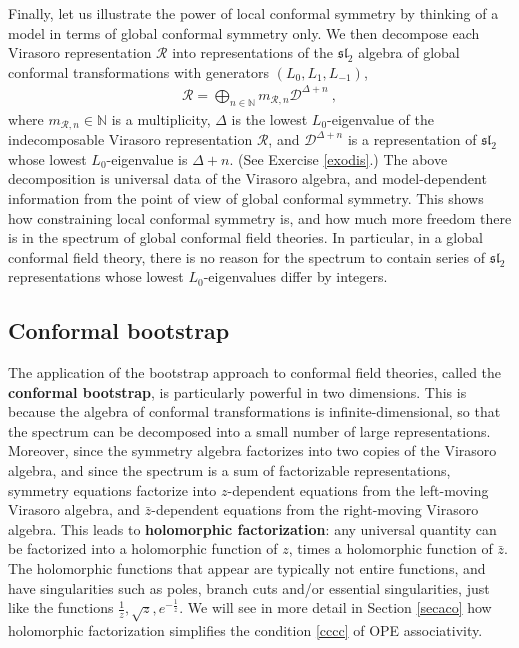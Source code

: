 \documentclass[12pt, a4paper, notitlepage, twoside]{report}
\numberwithin{equation}{section}
\theoremstyle{break}
\begin{document}
Finally, let us illustrate the power of local conformal symmetry by thinking of a model in terms of global conformal symmetry only. 
We then decompose each Virasoro representation $\mathcal{R}$ into representations of the $\mathfrak{sl}_2$ algebra of global conformal transformations with generators $(L_0,L_1,L_{-1})$,
\begin{align}
 \mathcal{R}=\bigoplus_{n\in{\mathbb{N}}} m_{\mathcal{R},n} \mathcal{D}^{\Delta+n}\ ,
\label{rbd}
\end{align}
where $m_{\mathcal{R},n}\in {\mathbb{N}}$ is a multiplicity, $\Delta$ is the lowest $L_0$-eigenvalue of the indecomposable Virasoro representation $\mathcal{R}$, and $\mathcal{D}^{\Delta+n}$ is a representation of $\mathfrak{sl}_2$ whose lowest $L_0$-eigenvalue is $\Delta+n$.
(See Exercise \ref{exodis}.)
The above decomposition is universal data of the Virasoro algebra, and 
model-dependent information from the point of view of global conformal symmetry.
This shows how constraining local conformal symmetry is, and how much more freedom there is in the spectrum of global conformal field theories.
In particular, in a global conformal field theory, there is no reason for the spectrum to contain series of
$\mathfrak{sl}_2$ representations whose lowest $L_0$-eigenvalues differ by integers. 


\subsection{Conformal bootstrap}

The application of the bootstrap approach to conformal field theories, called the \textbf{conformal bootstrap}, 
is particularly powerful in two dimensions.
This is because the algebra of conformal transformations is infinite-dimensional, 
so that the spectrum can be decomposed into a small number of large representations.
Moreover, since the symmetry algebra factorizes into two copies of the Virasoro algebra, and since the spectrum is a sum of factorizable representations,
symmetry equations factorize into $z$-dependent equations from the left-moving Virasoro algebra, and $\bar{z}$-dependent equations from the right-moving Virasoro algebra.
This leads to  \textbf{\boldmath holomorphic factorization}:
any universal quantity can be factorized into a holomorphic function of $z$, times a holomorphic function of $\bar z$. The holomorphic functions that appear are typically not entire functions, and have singularities such as poles, branch cuts and/or essential singularities, just like the functions $\frac{1}{z},\sqrt{z}, e^{-\frac{1}{z}}$. 
We will see in more detail in Section \ref{secaco} how holomorphic factorization simplifies the condition \eqref{cccc} of OPE associativity.
\end{document}
